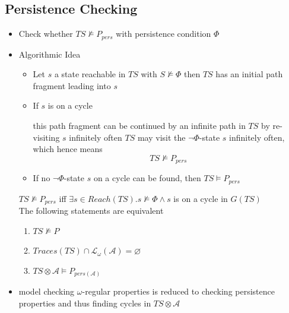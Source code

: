 \documentclass[a4paper, 10pt]{article}
\begin{document}
\subsection*{Persistence Checking}
\begin{itemize}
    \item Check whether $TS\not\models P_{pers}$ with persistence condition $\Phi$
    \item Algorithmic Idea
    \begin{itemize}
        \item Let $s$ a state reachable in $TS$ with $S\not\models\Phi$ \follows then $TS$ has an initial path fragment leading into $s$
        \item If $s$ is on a cycle
        \begin{itemize}
            \fitem this path fragment can be continued by an infinite path in $TS$ by re-visiting $s$ infinitely often
            \fitem $TS$ may visit the $\neg\Phi$-state $s$ infinitely often, which hence means \[ TS\not\models P_{pers} \]
        \end{itemize}
        \item If no $\neg\Phi$-state $s$ on a cycle can be found, then $TS\models P_{pers}$
    \end{itemize}
    \begin{shaded}
        $TS\not\models P_{pers}$ iff $\exists s\in Reach(TS).s\not\models\Phi\wedge s$ is on a cycle in $G(TS)$
        \\ The following statements are equivalent
        \begin{enumerate}
            \item $TS\not\models P$
            \item $Traces(TS)\cap \mathcal{L}_\omega(\mathcal{A})=\varnothing$
            \item $TS\otimes \mathcal{A}\models P_{pers(\mathcal{A})}$
        \end{enumerate}
    \end{shaded}
    \item model checking $\omega$-regular properties is reduced to checking persistence properties and thus finding cycles in $TS\otimes \mathcal{A}$
\end{itemize}
\end{document}
